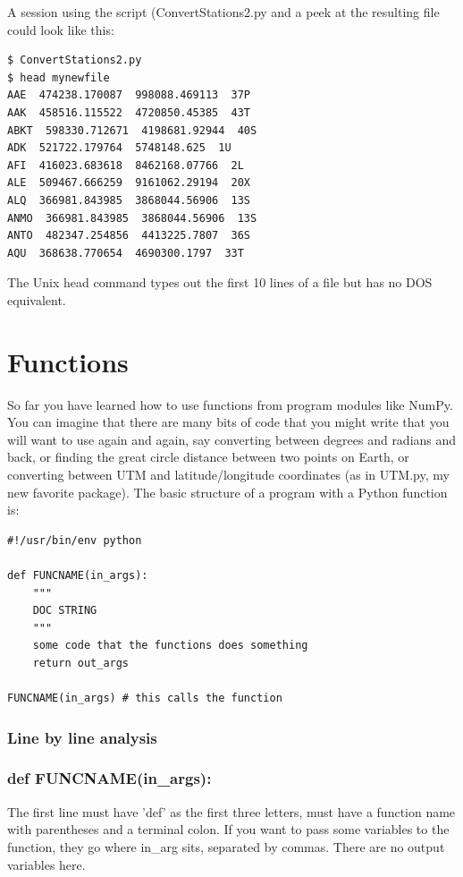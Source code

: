 \documentclass[11pt]{book}
\begin{document}
{{{{\noindent A session using the script ({\color{blue}ConvertStations2.py} and a peek at the resulting file could look like this:
{ \color{blue} \begin{verbatim}
$ ConvertStations2.py
$ head mynewfile
AAE  474238.170087  998088.469113  37P
AAK  458516.115522  4720850.45385  43T
ABKT  598330.712671  4198681.92944  40S
ADK  521722.179764  5748148.625  1U
AFI  416023.683618  8462168.07766  2L
ALE  509467.666259  9161062.29194  20X
ALQ  366981.843985  3868044.56906  13S
ANMO  366981.843985  3868044.56906  13S
ANTO  482347.254856  4413225.7807  36S
AQU  368638.770654  4690300.1797  33T
\end{verbatim}}

\noindent The Unix {\color{blue}head} command types out the first 10 lines of a file but has no DOS equivalent.


\section{Functions}

So far you have learned how to use functions from program modules like {\color{blue}NumPy}.  You can imagine that there are many bits of code that you might write that you will want to use again and again, say converting between degrees and radians and back, or finding the great circle distance between two points on Earth, or converting between UTM and latitude/longitude coordinates (as in {\color{blue}UTM.py}, my new favorite package).      The basic structure of a program with a  Python function is:


{ \color{blue} \begin{verbatim}
#!/usr/bin/env python

def FUNCNAME(in_args):
    """
    DOC STRING
    """
    some code that the functions does something
    return out_args

FUNCNAME(in_args) # this calls the function
\end{verbatim}}



\subsubsection{Line by line analysis}
\subsubsection{def FUNCNAME(in\_args):}

\noindent The first line must have 'def' as the first three letters, must have a function name with parentheses and a terminal colon.  If you want to pass some variables to the function, they go where  in\_arg sits, separated by commas.  There are no output variables here.

}}}}
\end{document}
